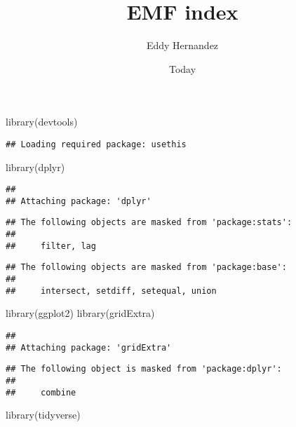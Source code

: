 \documentclass[
]{article}
\title{EMF index}
\author{Eddy Hernandez}
\date{Today}
\newenvironment{Shaded}{\begin{snugshade}}{\end{snugshade}}
\newcommand{\FunctionTok}[1]{\textcolor[rgb]{0.00,0.00,0.00}{#1}}
\newcommand{\NormalTok}[1]{#1}
\begin{document}
\maketitle

\begin{Shaded}
\begin{Highlighting}[]
\FunctionTok{library}\NormalTok{(devtools)}
\end{Highlighting}
\end{Shaded}

\begin{verbatim}
## Loading required package: usethis
\end{verbatim}

\begin{Shaded}
\begin{Highlighting}[]
\FunctionTok{library}\NormalTok{(dplyr)}
\end{Highlighting}
\end{Shaded}

\begin{verbatim}
## 
## Attaching package: 'dplyr'
\end{verbatim}

\begin{verbatim}
## The following objects are masked from 'package:stats':
## 
##     filter, lag
\end{verbatim}

\begin{verbatim}
## The following objects are masked from 'package:base':
## 
##     intersect, setdiff, setequal, union
\end{verbatim}

\begin{Shaded}
\begin{Highlighting}[]
\FunctionTok{library}\NormalTok{(ggplot2)}
\FunctionTok{library}\NormalTok{(gridExtra)}
\end{Highlighting}
\end{Shaded}

\begin{verbatim}
## 
## Attaching package: 'gridExtra'
\end{verbatim}

\begin{verbatim}
## The following object is masked from 'package:dplyr':
## 
##     combine
\end{verbatim}

\begin{Shaded}
\begin{Highlighting}[]
\FunctionTok{library}\NormalTok{(tidyverse)}
\end{Highlighting}
\end{Shaded}
\end{document}
